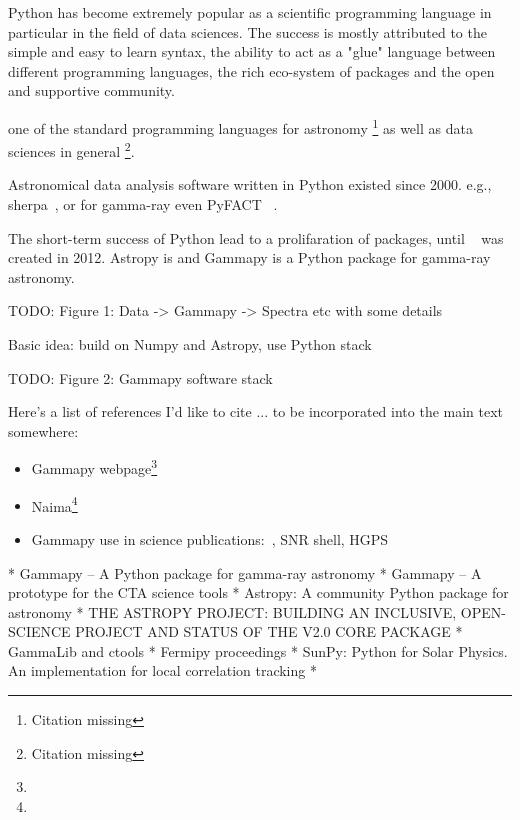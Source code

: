 Python has become extremely popular as a scientific programming language
in particular in the field of data sciences. The success is
mostly attributed to the simple and easy to learn syntax, the ability to act as
a "glue" language between different programming languages, the rich eco-system
of packages and the open and supportive community.

 one of the
standard programming  languages for astronomy \footnote{Citation missing} as
well as data sciences in  general \footnote{Citation missing}.

Astronomical data analysis software written in Python existed since 2000. e.g.,
sherpa~\citep{sherpa-2011, sherpa-2009}, or for gamma-ray even PyFACT
~\citep{pyfact}.

The short-term success of Python lead to a prolifaration of packages, until
\astropy~\citep{astropy} was created in 2012. Astropy is and Gammapy is a
Python package for gamma-ray astronomy.



TODO: Figure 1: Data -> Gammapy -> Spectra etc with some details

Basic idea: build on Numpy and Astropy, use Python stack

TODO: Figure 2: Gammapy software stack

Here's a list of references I'd like to cite ... to be incorporated into the
main text somewhere:

\begin{itemize}
	\item Gammapy webpage\footnote{\GammapyUrl}
	\item Naima\footnote{\NaimaUrl}~\citep{Naima}
	\item Gammapy use in science publications:~\citep{Owen2015}, SNR shell, HGPS
\end{itemize}

* Gammapy – A Python package for gamma-ray astronomy
* Gammapy – A prototype for the CTA science tools
* Astropy: A community Python package for astronomy
* THE ASTROPY PROJECT: BUILDING AN INCLUSIVE, OPEN-SCIENCE PROJECT AND STATUS
OF THE V2.0 CORE PACKAGE * GammaLib and ctools * Fermipy proceedings * SunPy:
Python for Solar Physics. An implementation for local correlation tracking *

